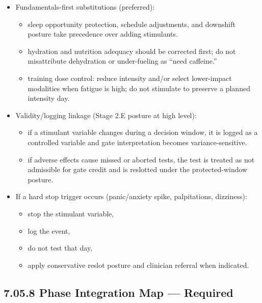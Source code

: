 \documentclass[10pt]{article}
\begin{document}
\begin{itemize}
\item Fundamentals-first substitutions (preferred):
  \begin{itemize}
  \item sleep opportunity protection, schedule adjustments, and downshift posture take precedence over adding stimulants.
  \item hydration and nutrition adequacy should be corrected first; do not misattribute dehydration or under-fueling as “need caffeine.”
  \item training dose control: reduce intensity and/or select lower-impact modalities when fatigue is high; do not stimulate to preserve a planned intensity day.
  \end{itemize}
\item Validity/logging linkage (Stage 2.E posture at high level):
  \begin{itemize}
  \item if a stimulant variable changes during a decision window, it is logged as a controlled variable and gate interpretation becomes variance-sensitive.
  \item if adverse effects cause missed or aborted tests, the test is treated as not admissible for gate credit and is reslotted under the protected-window posture.
  \end{itemize}
\item If a hard stop trigger occurs (panic/anxiety spike, palpitations, dizziness):
  \begin{itemize}
  \item stop the stimulant variable,
  \item log the event,
  \item do not test that day,
  \item apply conservative reslot posture and clinician referral when indicated.
  \end{itemize}
\end{itemize}

\subsection*{7.05.8 Phase Integration Map — Required}
{}

\begingroup
\scriptsize
\setlength{\tabcolsep}{2pt}
\renewcommand{\arraystretch}{1.10}
\end{document}
